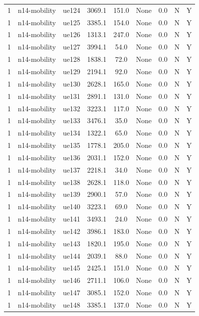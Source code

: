 \begin{table}[ht]
\begin{tabular}{|c|c|c|c|c|c|c|c|c|}
1 & n14-mobility & ue124 & 3069.1 & 151.0 & None & 0.0 & N & Y \\
1 & n14-mobility & ue125 & 3385.1 & 154.0 & None & 0.0 & N & Y \\
1 & n14-mobility & ue126 & 1313.1 & 247.0 & None & 0.0 & N & Y \\
1 & n14-mobility & ue127 & 3994.1 & 54.0 & None & 0.0 & N & Y \\
1 & n14-mobility & ue128 & 1838.1 & 72.0 & None & 0.0 & N & Y \\
1 & n14-mobility & ue129 & 2194.1 & 92.0 & None & 0.0 & N & Y \\
1 & n14-mobility & ue130 & 2628.1 & 165.0 & None & 0.0 & N & Y \\
1 & n14-mobility & ue131 & 2891.1 & 131.0 & None & 0.0 & N & Y \\
1 & n14-mobility & ue132 & 3223.1 & 117.0 & None & 0.0 & N & Y \\
1 & n14-mobility & ue133 & 3476.1 & 35.0 & None & 0.0 & N & Y \\
1 & n14-mobility & ue134 & 1322.1 & 65.0 & None & 0.0 & N & Y \\
1 & n14-mobility & ue135 & 1778.1 & 205.0 & None & 0.0 & N & Y \\
1 & n14-mobility & ue136 & 2031.1 & 152.0 & None & 0.0 & N & Y \\
1 & n14-mobility & ue137 & 2218.1 & 34.0 & None & 0.0 & N & Y \\
1 & n14-mobility & ue138 & 2628.1 & 118.0 & None & 0.0 & N & Y \\
1 & n14-mobility & ue139 & 2900.1 & 57.0 & None & 0.0 & N & Y \\
1 & n14-mobility & ue140 & 3223.1 & 69.0 & None & 0.0 & N & Y \\
1 & n14-mobility & ue141 & 3493.1 & 24.0 & None & 0.0 & N & Y \\
1 & n14-mobility & ue142 & 3986.1 & 183.0 & None & 0.0 & N & Y \\
1 & n14-mobility & ue143 & 1820.1 & 195.0 & None & 0.0 & N & Y \\
1 & n14-mobility & ue144 & 2039.1 & 88.0 & None & 0.0 & N & Y \\
1 & n14-mobility & ue145 & 2425.1 & 151.0 & None & 0.0 & N & Y \\
1 & n14-mobility & ue146 & 2711.1 & 106.0 & None & 0.0 & N & Y \\
1 & n14-mobility & ue147 & 3085.1 & 152.0 & None & 0.0 & N & Y \\
1 & n14-mobility & ue148 & 3385.1 & 137.0 & None & 0.0 & N & Y \\

\end{tabular}
\end{table}
